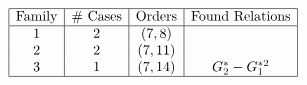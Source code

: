 \begin{table}[h]
	\centering
	$\begin{array}{|c|c|c|c|}
		\hline
		\text{Family} & \text{\# Cases} & \text{Orders} & \text{Found Relations} \\
		\hline
		1 & 2 & (7, 8) &  \\
		2 & 2 & (7, 11) &  \\
		3 & 1 & (7, 14) & G_2^* - G_1^{ *2} \\
		\hline
	\end{array}$
\end{table}
